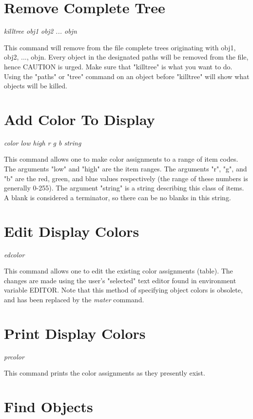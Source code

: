 \section{Remove Complete Tree}

{\em \center
killtree obj1 obj2 ... objn
}

This command will remove from the file complete trees originating with
obj1, obj2, ..., objn.
Every object in the designated paths will be removed from the file, hence
CAUTION is urged.
Make sure that "killtree" is what you want to do.
Using the "paths" or "tree" command on an object before "killtree" will
show what objects will be killed.

\section{Add Color To Display}

{\em \center
color low high r g b string
}

This command allows one to make color assignments to a range of item codes.
The arguments "low" and "high" are the item ranges.
The arguments "r", "g", and "b" are the red, green, and blue values
respectively (the range of these numbers is generally 0-255).
The argument "string" is a string describing this class of items.
A blank is considered a terminator, so there can be no blanks in
this string.

\section{Edit Display Colors}

{\em \center
edcolor
}

This command allows one to edit the existing color assignments (table).
The changes are made using the user's "selected" text editor
found in environment variable EDITOR.
Note that this method of specifying object colors is obsolete,
and has been replaced by the {\em mater} command.

\section{Print Display Colors}

{\em \center
prcolor
}

This command prints the color assignments as they presently exist.

\section{Find Objects}

